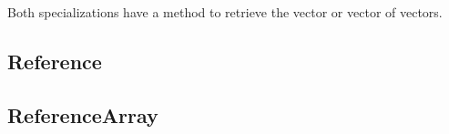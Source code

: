 

Both specializations have a  method to retrieve the vector or vector of vectors.



\subsection{Reference}
\label{section:member_types:reference}


\subsection{ReferenceArray}
\label{section:member_types:reference_array}

